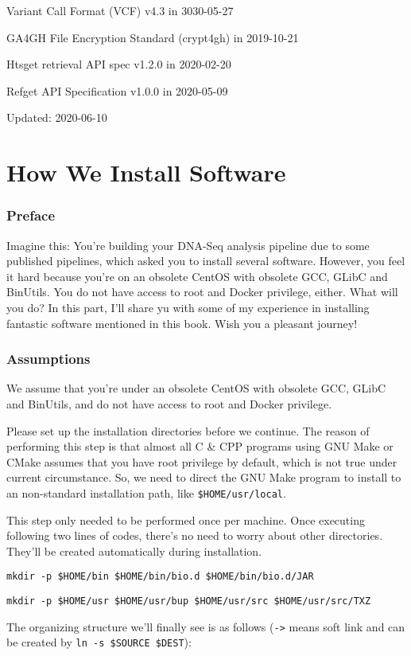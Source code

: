 \documentclass[]{article}
\begin{document}
Variant Call Format (VCF) v4.3 in 3030-05-27

GA4GH File Encryption Standard (crypt4gh) in 2019-10-21

Htsget retrieval API spec v1.2.0 in 2020-02-20

Refget API Specification v1.0.0 in 2020-05-09

Updated: 2020-06-10

\part{How We Install Software}
\section{Preface}
Imagine this: You're building your DNA-Seq analysis pipeline due to some published pipelines, which asked you to install several software. However, you feel it hard because you're on an obsolete CentOS with obsolete GCC, GLibC and BinUtils. You do not have access to root and Docker privilege, either. What will you do? In this part, I'll share yu with some of my experience in installing fantastic software mentioned in this book. Wish you a pleasant journey!

\section{Assumptions}
We assume that you're under an obsolete CentOS with obsolete GCC, GLibC and BinUtils, and do not have access to root and Docker privilege.

Please set up the installation directories before we continue. The reason of performing this step is that almost all C \& CPP programs using GNU Make or CMake assumes that you have root privilege by default, which is not true under current circumstance. So, we need to direct the GNU Make program to install to an non-standard installation path, like \verb|$HOME/usr/local|.

This step only needed to be performed once per machine. Once executing following two lines of codes, there's no need to worry about other directories. They'll be created automatically during installation.

\verb|mkdir -p $HOME/bin $HOME/bin/bio.d $HOME/bin/bio.d/JAR|

\verb|mkdir -p $HOME/usr $HOME/usr/bup $HOME/usr/src $HOME/usr/src/TXZ|

The organizing structure we'll finally see is as follows (\verb|->| means soft link and can be created by \verb|ln -s $SOURCE $DEST|):
\end{document}
